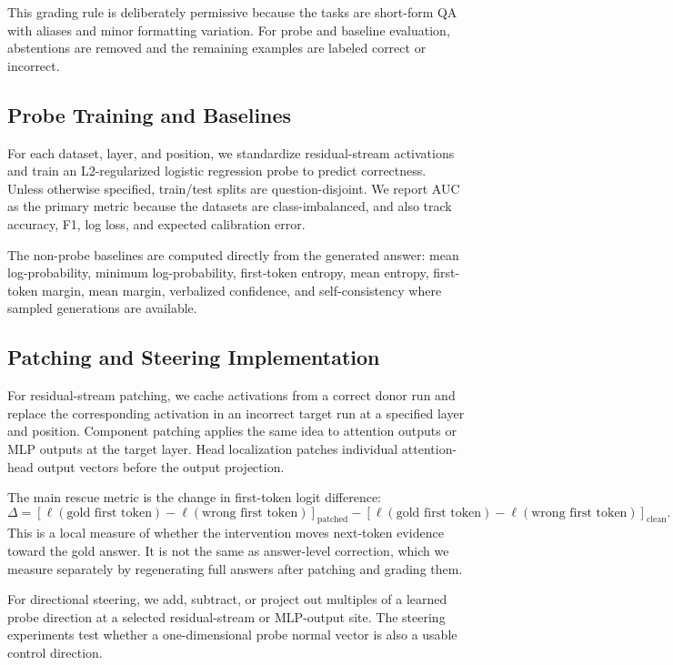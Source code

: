 \documentclass{article}
\begin{document}
This grading rule is deliberately permissive because the tasks are short-form QA
with aliases and minor formatting variation. For probe and baseline evaluation,
abstentions are removed and the remaining examples are labeled correct or
incorrect.

\subsection{Probe Training and Baselines}

For each dataset, layer, and position, we standardize residual-stream activations
and train an L2-regularized logistic regression probe to predict correctness.
Unless otherwise specified, train/test splits are question-disjoint. We report
AUC as the primary metric because the datasets are class-imbalanced, and also
track accuracy, F1, log loss, and expected calibration error.

The non-probe baselines are computed directly from the generated answer: mean
log-probability, minimum log-probability, first-token entropy, mean entropy,
first-token margin, mean margin, verbalized confidence, and self-consistency where
sampled generations are available.

\subsection{Patching and Steering Implementation}

For residual-stream patching, we cache activations from a correct donor run and
replace the corresponding activation in an incorrect target run at a specified
layer and position. Component patching applies the same idea to attention outputs
or MLP outputs at the target layer. Head localization patches individual
attention-head output vectors before the output projection.

The main rescue metric is the change in first-token logit difference:
\[
\Delta =
\left[\ell(\text{gold first token}) - \ell(\text{wrong first token})\right]_{\text{patched}}
-
\left[\ell(\text{gold first token}) - \ell(\text{wrong first token})\right]_{\text{clean}}.
\]
This is a local measure of whether the intervention moves next-token evidence
toward the gold answer. It is not the same as answer-level correction, which we
measure separately by regenerating full answers after patching and grading them.

For directional steering, we add, subtract, or project out multiples of a learned
probe direction at a selected residual-stream or MLP-output site. The steering
experiments test whether a one-dimensional probe normal vector is also a usable
control direction.
\end{document}
